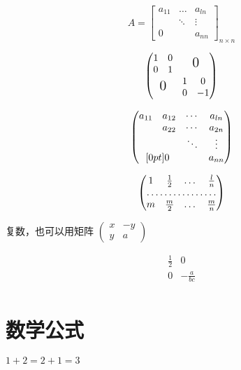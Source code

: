 \documentclass[10pt]{ctexart}%
\begin{document}
 	\[
 	A= \begin{bmatrix}
 		a_{11} & \dots & a_{ln} \\
 		& \ddots & \vdots \\
 		0 & & a_{nn}
 	\end{bmatrix}_{n \times n}
	\]
	
	
	\[
	\begin{pmatrix}
	\begin{matrix} 1&0 \\0&1 \end{matrix}
	& \text{\Large 0} \\
	\text{\Large 0} & \begin{matrix}
	1&0\\0&-1 
	\end{matrix}
	\end{pmatrix}
	\]
	
	\[
	\begin{pmatrix}
		a_{11} & a_{12} & \cdots &a_{ln}\\
		&a_{22} & \cdots & a_{2n}\\
		&       &\ddots & \vdots \\
		\multicolumn{2}{c}{\raisetag{1.3ex}[0pt]{\Huge 0}}
		&       &a_{nn}
	\end{pmatrix}
	\]
	
	\[
	\begin{pmatrix}
	1 & \frac 12 & \dots  & \frac ln \\
	\hdotsfor{4}\\
	m & \frac m2 & \dots & \frac mn
	\end{pmatrix}
	\]
	
	复数，也可以用矩阵
	\begin{math}
		\left(
		\begin{smallmatrix}
		x & -y \\ y & a
		\end{smallmatrix}
		\right)
	\end{math}
	
	\[
	\begin{array}{r|r}
	\frac12 & 0\\
	\hline
	0 & -\frac a{bc} \\
	\end{array}
	\]
	
	
	\section{数学公式}
	$1+2=2+1=3$
	
\end{document}
